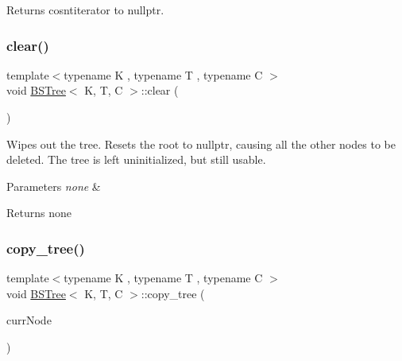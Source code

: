 \begin{DoxyReturn}{Returns}
cosntiterator to nullptr. 
\end{DoxyReturn}
\mbox{\label{class_b_s_tree_ae5362c45ed2bc96c9c72fdef689bd078}} 
\subsubsection{\texorpdfstring{clear()}{clear()}}
{\footnotesize\ttfamily template$<$typename K , typename T , typename C $>$ \\
void \hyperlink{class_b_s_tree}{B\+S\+Tree}$<$ K, T, C $>$\+::clear (\begin{DoxyParamCaption}{ }\end{DoxyParamCaption})\hspace{0.3cm}{\ttfamily [noexcept]}}



Wipes out the tree. Resets the root to nullptr, causing all the other nodes to be deleted. The tree is left uninitialized, but still usable. 


\begin{DoxyParams}{Parameters}
{\em none} & \\
\hline
\end{DoxyParams}
\begin{DoxyReturn}{Returns}
none 
\end{DoxyReturn}
\mbox{\label{class_b_s_tree_ad34bd4cfe46ab5a5376cc242b1901f2b}} 
\subsubsection{\texorpdfstring{copy\+\_\+tree()}{copy\_tree()}}
{\footnotesize\ttfamily template$<$typename K , typename T , typename C $>$ \\
void \hyperlink{class_b_s_tree}{B\+S\+Tree}$<$ K, T, C $>$\+::copy\+\_\+tree (\begin{DoxyParamCaption}\item[{const \hyperlink{class_node_namespace_1_1_b_s_t_node}{B\+S\+T\+Node}$<$ K, T $>$ $\ast$}]{curr\+Node }\end{DoxyParamCaption})\hspace{0.3cm}{\ttfamily [private]}}



